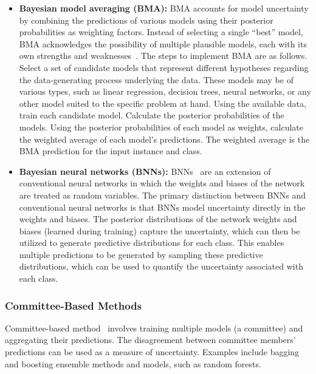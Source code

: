 \begin{itemize}
    \item \relax \textbf{Bayesian model averaging (BMA):} BMA accounts for model uncertainty by combining the predictions of various models using their posterior probabilities as weighting factors. Instead of selecting a single ``best'' model, BMA acknowledges the possibility of multiple plausible models, each with its own strengths and weaknesses~\cite{hoeting_Bayesian_1999}. The steps to implement BMA are as follows. Select a set of candidate models that represent different hypotheses regarding the data-generating process underlying the data. These models may be of various types, such as linear regression, decision trees, neural networks, or any other model suited to the specific problem at hand. Using the available data, train each candidate model. Calculate the posterior probabilities of the models. Using the posterior probabilities of each model as weights, calculate the weighted average of each model's predictions. The weighted average is the BMA prediction for the input instance and class.

    \item \relax \textbf{Bayesian neural networks (BNNs):} BNNs~\cite{mullachery_Bayesian_2018} are an extension of conventional neural networks in which the weights and biases of the network are treated as random variables. The primary distinction between BNNs and conventional neural networks is that BNNs model uncertainty directly in the weights and biases. The posterior distributions of the network weights and biases (learned during training) capture the uncertainty, which can then be utilized to generate predictive distributions for each class. This enables multiple predictions to be generated by sampling these predictive distributions, which can be used to quantify the uncertainty associated with each class.
\end{itemize}

\subsubsection{Committee-Based Methods}

Committee-based method~\cite{wang_Wisdom_2020} involves training multiple models (a committee) and aggregating their predictions. The disagreement between committee members' predictions can be used as a measure of uncertainty. Examples include bagging and boosting ensemble methods and models, such as random forests.

